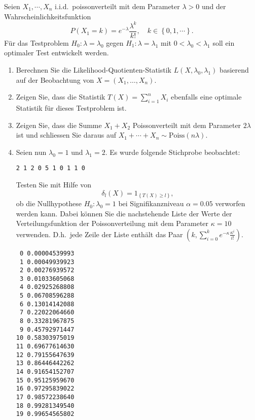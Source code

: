  Seien $X_1, \cdots, X_n$ i.i.d.\
poissonverteilt mit dem Parameter $\lambda>0$ und der Wahrscheinlichkeitsfunktion
\begin{equation*}
    P(X_1 = k) = e^{-\lambda} \frac{ \lambda^k}{k!}, \quad k \in \left\{ 0, 1, \cdots \right\}.
\end{equation*}
Für das Testproblem $H_0 : \lambda=\lambda_0$ gegen $H_1 : \lambda=\lambda_1$
mit $0<\lambda_0<\lambda_1$ soll ein optimaler Test entwickelt werden.
\begin{enumerate}
    \item Berechnen Sie die Likelihood-Quotienten-Statistik
        $L(X,\lambda_0,\lambda_1)$ basierend auf der Beobachtung von $X=\left(
        X_1,\ldots,X_n \right)$.
    \item Zeigen Sie, dass die Statistik $T(X)= \sum_{i=1}^{n} X_i$ ebenfalls
        eine optimale Statistik für dieses Testproblem ist.
    \item Zeigen Sie, dass die Summe $X_1+X_2$ Poissonverteilt mit dem
        Parameter $2 \lambda$ ist und schliessen Sie daraus auf $X_1 + \cdots +
        X_n \sim \text{Poiss}(n \lambda)$. 
    \item Seien nun $\lambda_0=1$ und $\lambda_1=2$. Es wurde folgende Stichprobe beobachtet:
        \begin{lstlisting}
2 1 2 0 5 1 0 1 1 0
        \end{lstlisting}
        Testen Sie mit Hilfe von 
        \begin{equation*}
            \delta_l(X) = 1_{   \left\{ T(X) \geq l \right\}},
        \end{equation*}
        ob die Nullhypothese $H_0 : \lambda_0=1$ bei Signifikanzniveau
        $\alpha=0.05$ verworfen werden kann. Dabei können Sie die nachstehende
        Liste der Werte der Verteilungsfunktion der Poissonverteilung mit dem
        Parameter $\kappa=10$ verwenden.  D.h.\ jede Zeile der Liste
        enthält das Paar  $\left( k, \sum_{i=0}^{k} e^{-\kappa}
        \frac{\kappa^{i}}{i!}\right)$.
\begin{lstlisting}
 0 0.00004539993
 1 0.00049939923
 2 0.00276939572
 3 0.01033605068
 4 0.02925268808
 5 0.06708596288
 6 0.13014142088
 7 0.22022064660
 8 0.33281967875
 9 0.45792971447
10 0.58303975019
11 0.69677614630
12 0.79155647639
13 0.86446442262
14 0.91654152707
15 0.95125959670
16 0.97295839022
17 0.98572238640
18 0.99281349540
19 0.99654565802
\end{lstlisting}
\end{enumerate}

